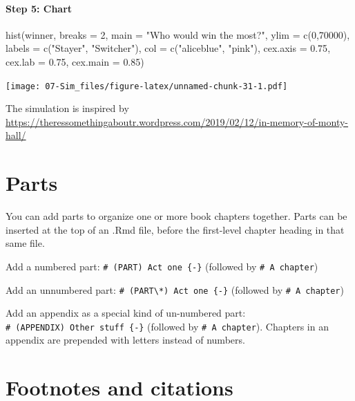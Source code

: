 \documentclass[
]{book}
\newenvironment{Shaded}{\begin{snugshade}}{\end{snugshade}}
\newcommand{\AttributeTok}[1]{\textcolor[rgb]{0.77,0.63,0.00}{#1}}
\newcommand{\DecValTok}[1]{\textcolor[rgb]{0.00,0.00,0.81}{#1}}
\newcommand{\FloatTok}[1]{\textcolor[rgb]{0.00,0.00,0.81}{#1}}
\newcommand{\FunctionTok}[1]{\textcolor[rgb]{0.00,0.00,0.00}{#1}}
\newcommand{\NormalTok}[1]{#1}
\newcommand{\StringTok}[1]{\textcolor[rgb]{0.31,0.60,0.02}{#1}}
\theoremstyle{definition}
\theoremstyle{definition}
\theoremstyle{definition}
\theoremstyle{definition}
\theoremstyle{remark}
\begin{document}
\hypertarget{step-5-chart}{%
\subsubsection*{Step 5: Chart}\label{step-5-chart}}

\begin{Shaded}
\begin{Highlighting}[]
\FunctionTok{hist}\NormalTok{(winner, }\AttributeTok{breaks =} \DecValTok{2}\NormalTok{, }\AttributeTok{main =} \StringTok{"Who would win the most?"}\NormalTok{,}
     \AttributeTok{ylim =} \FunctionTok{c}\NormalTok{(}\DecValTok{0}\NormalTok{,}\DecValTok{70000}\NormalTok{), }\AttributeTok{labels =} \FunctionTok{c}\NormalTok{(}\StringTok{"Stayer"}\NormalTok{, }\StringTok{"Switcher"}\NormalTok{),}
     \AttributeTok{col =} \FunctionTok{c}\NormalTok{(}\StringTok{"aliceblue"}\NormalTok{, }\StringTok{"pink"}\NormalTok{),}
     \AttributeTok{cex.axis =} \FloatTok{0.75}\NormalTok{, }\AttributeTok{cex.lab =} \FloatTok{0.75}\NormalTok{, }\AttributeTok{cex.main =} \FloatTok{0.85}\NormalTok{)}
\end{Highlighting}
\end{Shaded}

\texttt{[image: 07-Sim\_files/figure-latex/unnamed-chunk-31-1.pdf]}

The simulation is inspired by \url{https://theressomethingaboutr.wordpress.com/2019/02/12/in-memory-of-monty-hall/} \citep{Rajter_2019}

\hypertarget{parts}{%
\chapter{Parts}\label{parts}}

You can add parts to organize one or more book chapters together. Parts can be inserted at the top of an .Rmd file, before the first-level chapter heading in that same file.

Add a numbered part: \texttt{\#\ (PART)\ Act\ one\ \{-\}} (followed by \texttt{\#\ A\ chapter})

Add an unnumbered part: \texttt{\#\ (PART\textbackslash{}*)\ Act\ one\ \{-\}} (followed by \texttt{\#\ A\ chapter})

Add an appendix as a special kind of un-numbered part: \texttt{\#\ (APPENDIX)\ Other\ stuff\ \{-\}} (followed by \texttt{\#\ A\ chapter}). Chapters in an appendix are prepended with letters instead of numbers.

\hypertarget{footnotes-and-citations}{%
\chapter{Footnotes and citations}\label{footnotes-and-citations}}
\end{document}
